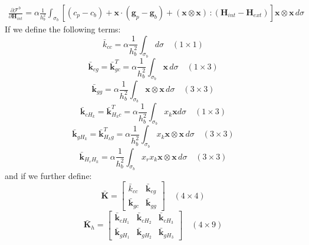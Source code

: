 \documentclass[11pt]{article} %
\begin{document}
\begin{eqnarray}
	\frac{\partial \mathcal{F}^b}{\partial \mathbf{H}_{int}} = \alpha \frac{1}{h_b^2} \int_{\sigma_b} \left[ (c_p - c_b) + \mathbf{x} \cdot (\mathbf{g}_p - \mathbf{g}_b) + (\mathbf{x} \otimes \mathbf{x}) \, \colon (\mathbf{H}_{int} - \mathbf{H}_{ext}) \right] \mathbf{x} \otimes \mathbf{x} \, d \sigma
\end{eqnarray}
If we define the following terms:
\begin{equation}
	\bar{k}_{cc} = \alpha \frac{1}{h_b^2} \int_{\sigma_b} d \sigma \quad (1 \times 1)
\end{equation}
\begin{equation}
	\bar{\mathbf{k}}_{cg} = \bar{\mathbf{k}}^T_{gc} = \alpha \frac{1}{h_b^2} \int_{\sigma_b} \mathbf{x} \, d \sigma \quad (1 \times 3)
\end{equation}
\begin{equation}
	\bar{\mathbf{k}}_{gg} = \alpha \frac{1}{h_b^2} \int_{\sigma_b} \mathbf{x} \otimes \mathbf{x} \, d \sigma \quad (3 \times 3)
\end{equation}
\begin{equation}
	\bar{\mathbf{k}}_{cH_k} = \bar{\mathbf{k}}^T_{H_kc} = \alpha \frac{1}{h_b^2} \int_{\sigma_b} x_k \mathbf{x} d \sigma \quad (1 \times 3)
\end{equation}
\begin{equation}
	\bar{\mathbf{k}}_{gH_k} = \bar{\mathbf{k}}_{H_kg}^T = \alpha \frac{1}{h_b^2} \int_{\sigma_b} x_k \mathbf{x} \otimes \mathbf{x} \, d \sigma \quad (3 \times 3)
\end{equation}
\begin{equation}
	\bar{\mathbf{k}}_{H_rH_k} = \alpha \frac{1}{h_b^2} \int_{\sigma_b} x_r x_k \mathbf{x} \otimes \mathbf{x} \, d \sigma \quad (3 \times 3)
\end{equation}
and if we further define:
\begin{equation}
	\bar{\mathbf{K}} = \left[ \begin{array}{ccccc} \bar{k}_{cc} & \bar{\mathbf{k}}_{cg} \\ \bar{\mathbf{k}}_{gc} & \bar{\mathbf{k}}_{gg} \end{array} \right] \quad (4 \times 4)
\end{equation}
\begin{equation}
	\bar{\mathbf{K}}_{h} = \left[ \begin{array}{ccc} \bar{\mathbf{k}}_{cH_1} & \bar{\mathbf{k}}_{cH_2} & \bar{\mathbf{k}}_{cH_3} \\ \bar{\mathbf{k}}_{gH_1} & \bar{\mathbf{k}}_{gH_2} & \bar{\mathbf{k}}_{gH_3} \end{array} \right] \quad (4 \times 9)
\end{equation}
\end{document}
